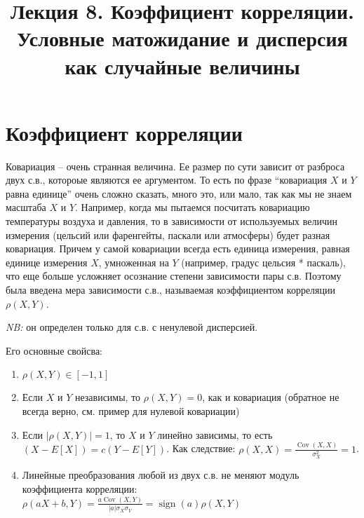 \documentclass[12pt]{article}
\title{Лекция 8. Коэффициент корреляции. Условные матожидание и дисперсия как случайные величины}
\DeclareMathOperator{\Cov}{Cov}
\DeclareMathOperator{\sign}{sign}
\begin{document}
\maketitle


\section{Коэффициент корреляции}

Ковариация -- очень странная величина. Ее размер по сути зависит от разброса двух с.в., котороые являются ее аргументом. То есть по фразе ``ковариация $X$ и $Y$ равна единице'' очень сложно сказать, много это, или мало, так как мы не знаем масштаба $X$ и $Y$. Например, когда мы пытаемся посчитать ковариацию температуры воздуха и давления, то в зависимости от используемых величин измерения (цельсий или фаренгейты, паскали или атмосферы) будет разная ковариация. Причем у самой ковариации всегда есть единица измерения, равная единице измерения $X$, умноженная на $Y$ (например, градус цельсия * паскаль), что еще больше усложняет осознание степени зависимости пары с.в. Поэтому была введена мера зависимости с.в., называемая коэффициентом корреляции $\rho(X, Y)$.

\begin{center}
\end{center}

\emph{NB:} он определен только для с.в. с ненулевой дисперсией. 

Его основные свойсва:

\begin{enumerate}
  \item $\rho(X, Y)\in [-1, 1]$
  \item Если $X$ и $Y$ независимы, то $\rho(X, Y) = 0$, как и ковариация (обратное не всегда верно, см. пример для нулевой ковариации)
  \item Если $|\rho(X, Y)| = 1$, то $X$ и $Y$ линейно зависимы, то есть $(X - E[X]) = c(Y - E[Y])$. Как следствие: $\rho(X, X) = \frac{\Cov(X, X)}{\sigma_X^2} = 1$.
  \item Линейные преобразования любой из двух с.в. не меняют модуль коэффициента корреляции: $\rho(aX + b, Y) = \frac{a\Cov(X, Y)}{|a|\sigma_X \sigma_Y} = \sign(a)\rho(X, Y)$
\end{enumerate}
\end{document}
